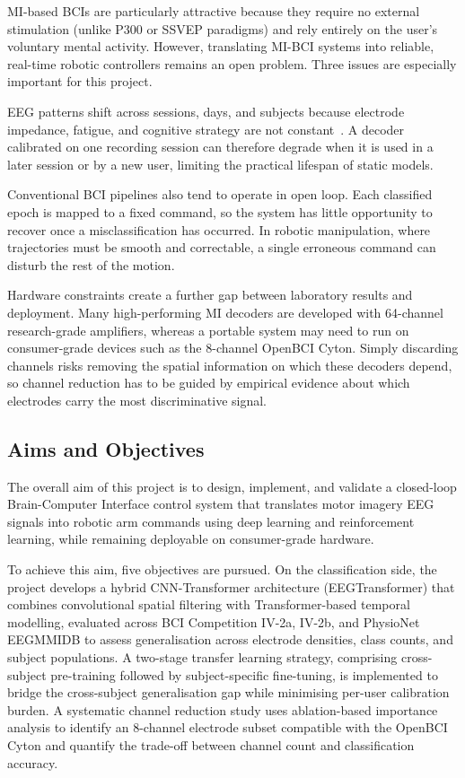 \documentclass[12pt, a4paper]{article}
\begin{document}
MI-based BCIs are particularly attractive because they require no external stimulation (unlike P300 or SSVEP paradigms) and rely entirely on the user's voluntary mental activity. However, translating MI-BCI systems into reliable, real-time robotic controllers remains an open problem. Three issues are especially important for this project.

EEG patterns shift across sessions, days, and subjects because electrode impedance, fatigue, and cognitive strategy are not constant~\cite{hameed2025enhancing}. A decoder calibrated on one recording session can therefore degrade when it is used in a later session or by a new user, limiting the practical lifespan of static models.

Conventional BCI pipelines also tend to operate in open loop. Each classified epoch is mapped to a fixed command, so the system has little opportunity to recover once a misclassification has occurred. In robotic manipulation, where trajectories must be smooth and correctable, a single erroneous command can disturb the rest of the motion.

Hardware constraints create a further gap between laboratory results and deployment. Many high-performing MI decoders are developed with 64-channel research-grade amplifiers, whereas a portable system may need to run on consumer-grade devices such as the 8-channel OpenBCI Cyton. Simply discarding channels risks removing the spatial information on which these decoders depend, so channel reduction has to be guided by empirical evidence about which electrodes carry the most discriminative signal.

\subsection{Aims and Objectives}

The overall aim of this project is to design, implement, and validate a closed-loop Brain-Computer Interface control system that translates motor imagery EEG signals into robotic arm commands using deep learning and reinforcement learning, while remaining deployable on consumer-grade hardware.

To achieve this aim, five objectives are pursued. On the classification side, the project develops a hybrid CNN-Transformer architecture (EEGTransformer) that combines convolutional spatial filtering with Transformer-based temporal modelling, evaluated across BCI Competition IV-2a, IV-2b, and PhysioNet EEGMMIDB to assess generalisation across electrode densities, class counts, and subject populations. A two-stage transfer learning strategy, comprising cross-subject pre-training followed by subject-specific fine-tuning, is implemented to bridge the cross-subject generalisation gap while minimising per-user calibration burden. A systematic channel reduction study uses ablation-based importance analysis to identify an 8-channel electrode subset compatible with the OpenBCI Cyton and quantify the trade-off between channel count and classification accuracy.
\end{document}
